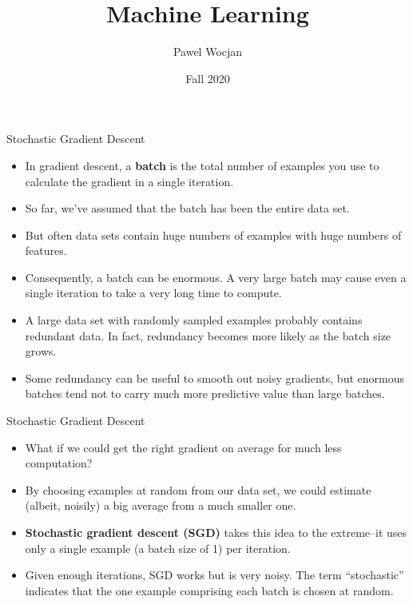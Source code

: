 \documentclass{beamer}
\title[ML]{Machine Learning}
\author{Pawel Wocjan}
\institute{University of Central Florida}
\date{Fall 2020}
\begin{document}
\begin{frame}
  \titlepage
\end{frame}

\begin{frame}{Stochastic Gradient Descent}


\begin{itemize}
\item In gradient descent, a {\bf batch} is the total number of examples you use to calculate the gradient in a single iteration. 
    \item So far, we've assumed that the batch has been the entire data set. 
    \item But often data sets contain huge numbers of examples with huge numbers of features.
    \item Consequently, a batch can be enormous. A very large batch may cause even a single iteration to take a very long time to compute.
    \item A large data set with randomly sampled examples probably contains redundant data. In fact, redundancy becomes more likely as the batch size grows. 
    \item Some redundancy can be useful to smooth out noisy gradients, but enormous batches tend not to carry much more predictive value than large batches.
\end{itemize}
\end{frame}

\begin{frame}{Stochastic Gradient Descent}

\begin{itemize}
\item What if we could get the right gradient on average for much less computation? 

\medskip
\item By choosing examples at random from our data set, we could estimate (albeit, noisily) a big average from a much smaller one. 

\medskip
\item {\bf Stochastic gradient descent (SGD)} takes this idea to the extreme--it uses only a single example (a batch size of 1) per iteration. 

\medskip
\item Given enough iterations, SGD works but is very noisy. The term ``stochastic'' indicates that the one example comprising each batch is chosen at random.
\end{itemize}

\end{frame}
\end{document}
